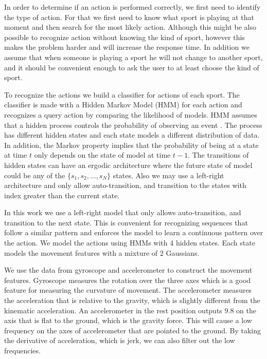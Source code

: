 In order to determine if an action is performed correctly, we first need to identify the type of action. For that we first need to know what sport is playing at that moment and then search for the most likely action. Although this might be also possible to recognize action without knowing the kind of sport, however this makes the problem harder and will increase the response time. In addition we assume that when someone is playing a sport he will not change to another sport, and it should be convenient enough to ask the user to at least choose the kind of sport.

To recognize the actions we build a classifier for actions of each sport. The classifier is made with a Hidden Markov Model (HMM) for each action and recognizes a query action by comparing the likelihood of models. HMM assumes that a hidden process controls the probability of observing an event \cite{rabiner1986introduction}. The process has different hidden states and each state models a different distribution of data. In addition, the Markov property implies that the probability of being at a state at time $t$ only depends on the state of model at time $t-1$. The transitions of hidden states can have an ergodic architecture where the future state of model could be any of the $\{s_1,s_2,...,s_N\}$ states. Also we may use a left-right architecture and only allow auto-transition, and transition to the states with index greater than the current state.

In this work we use a left-right model that only allows auto-transition, and transition to the next state. This is convenient for recognizing sequences that follow a similar pattern and enforces the model to learn a continuous pattern over the action. We model the actions using HMMs with 4 hidden states. Each state models the movement features with a mixture of 2 Gaussians.

We use the data from gyroscope and accelerometer to construct the movement features. Gyroscope measures the rotation over the three axes which is a good feature for measuring the curvature of movement. The accelerometer measures the acceleration that is relative to the gravity, which is slightly different from the kinematic acceleration. An accelerometer in the rest position outputs $9.8$ on the axis that is flat to the ground, which is the gravity force. This will cause a low frequency on the axes of accelerometer that are pointed to the ground. By taking the derivative of acceleration, which is jerk, we can also filter out the low frequencies.

